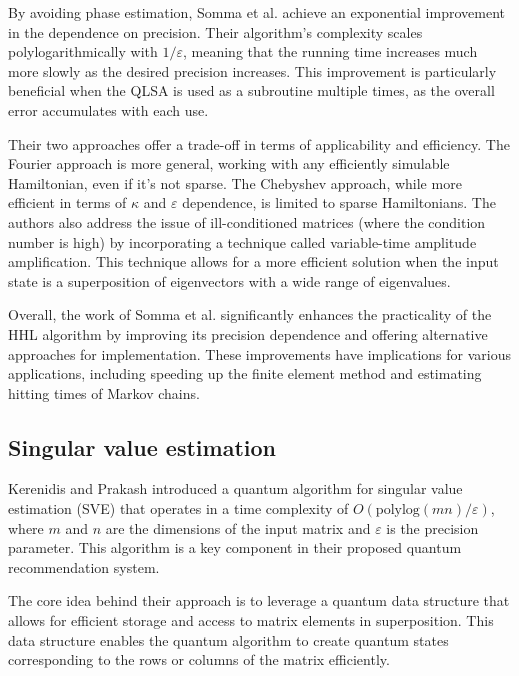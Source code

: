 \documentclass[12pt]{extarticle}
\begin{document}
By avoiding phase estimation, Somma et al. achieve an exponential improvement in the dependence on precision.
Their algorithm's complexity scales polylogarithmically with $1/\varepsilon$, meaning that the running time increases much more slowly as the desired precision increases.
This improvement is particularly beneficial when the QLSA is used as a subroutine multiple times, as the overall error accumulates with each use.

Their two approaches offer a trade-off in terms of applicability and efficiency.
The Fourier approach is more general, working with any efficiently simulable Hamiltonian, even if it's not sparse.
The Chebyshev approach, while more efficient in terms of $\kappa$ and $\varepsilon$ dependence, is limited to sparse Hamiltonians.
The authors also address the issue of ill-conditioned matrices (where the condition number is high) by incorporating a technique called variable-time amplitude amplification.
This technique allows for a more efficient solution when the input state is a superposition of eigenvectors with a wide range of eigenvalues.

Overall, the work of Somma et al. significantly enhances the practicality of the HHL algorithm by improving its precision dependence and offering alternative approaches for implementation.
These improvements have implications for various applications, including speeding up the finite element method and estimating hitting times of Markov chains.

\subsection{Singular value estimation}


Kerenidis and Prakash\cite{kerenidis2016quantum} introduced a quantum algorithm for singular value estimation (SVE) that operates in a time complexity of $O(\text{polylog}(mn)/\varepsilon)$,
where $m$ and $n$ are the dimensions of the input matrix and $\varepsilon$ is the precision parameter.
This algorithm is a key component in their proposed quantum recommendation system.

The core idea behind their approach is to leverage a quantum data structure that allows for efficient storage and access to matrix elements in superposition.
This data structure enables the quantum algorithm to create quantum states corresponding to the rows or columns of the matrix efficiently.
\end{document}
